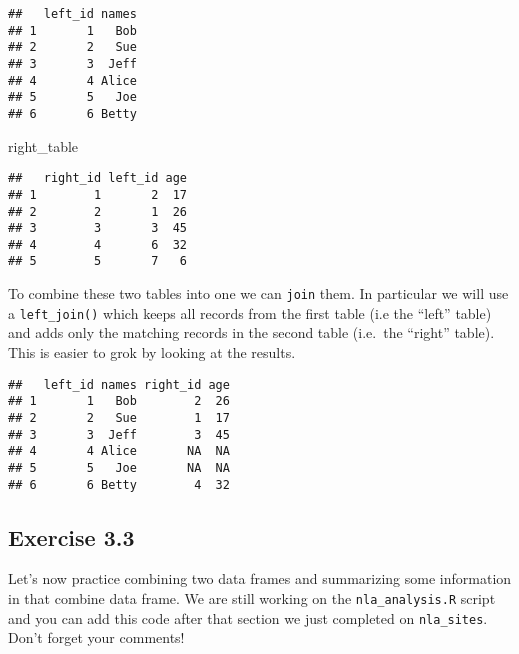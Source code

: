 \documentclass[]{article}
\newenvironment{Shaded}{\begin{snugshade}}{\end{snugshade}}
\newcommand{\DataTypeTok}[1]{\textcolor[rgb]{0.13,0.29,0.53}{#1}}
\newcommand{\KeywordTok}[1]{\textcolor[rgb]{0.13,0.29,0.53}{\textbf{#1}}}
\newcommand{\NormalTok}[1]{#1}
\newcommand{\OperatorTok}[1]{\textcolor[rgb]{0.81,0.36,0.00}{\textbf{#1}}}
\newcommand{\StringTok}[1]{\textcolor[rgb]{0.31,0.60,0.02}{#1}}
\begin{document}
\begin{verbatim}
##   left_id names
## 1       1   Bob
## 2       2   Sue
## 3       3  Jeff
## 4       4 Alice
## 5       5   Joe
## 6       6 Betty
\end{verbatim}

\begin{Shaded}
\begin{Highlighting}[]
\NormalTok{right_table}
\end{Highlighting}
\end{Shaded}

\begin{verbatim}
##   right_id left_id age
## 1        1       2  17
## 2        2       1  26
## 3        3       3  45
## 4        4       6  32
## 5        5       7   6
\end{verbatim}

To combine these two tables into one we can \texttt{join} them. In
particular we will use a \texttt{left\_join()} which keeps all records
from the first table (i.e the ``left'' table) and adds only the matching
records in the second table (i.e.~the ``right'' table). This is easier
to grok by looking at the results.

\begin{Shaded}
\end{Shaded}

\begin{verbatim}
##   left_id names right_id age
## 1       1   Bob        2  26
## 2       2   Sue        1  17
## 3       3  Jeff        3  45
## 4       4 Alice       NA  NA
## 5       5   Joe       NA  NA
## 6       6 Betty        4  32
\end{verbatim}

\hypertarget{exercise-3.3}{%
\subsection{Exercise 3.3}\label{exercise-3.3}}

Let's now practice combining two data frames and summarizing some
information in that combine data frame. We are still working on the
\texttt{nla\_analysis.R} script and you can add this code after that
section we just completed on \texttt{nla\_sites}. Don't forget your
comments!
\end{document}
